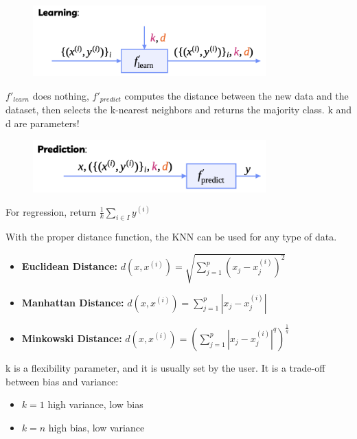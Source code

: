 \begin{figure}[H]
    \centering
    \includegraphics[width=0.8\textwidth]{assets/fig33.png}
\end{figure}

$f'_{learn}$ does nothing, $f'_{predict}$ computes the distance between the new data and the dataset, then selects the k-nearest neighbors and returns the majority class. k and d are parameters!

\begin{figure}[H]
    \centering
    \includegraphics[width=0.8\textwidth]{assets/fig34.png}
\end{figure}

For regression, return $\frac{1}{k}\sum_{i \in I}y^{(i)}$

With the proper distance function, the KNN can be used for any type of data.

\begin{exampleblock}
    \begin{itemize}
        \item \textbf{Euclidean Distance:} $d(x, x^{(i)}) = \sqrt{\sum_{j=1}^{p}(x_j - x^{(i)}_j)^2}$
        \item \textbf{Manhattan Distance:} $d(x, x^{(i)}) = \sum_{j=1}^{p}|x_j - x^{(i)}_j|$
        \item \textbf{Minkowski Distance:} $d(x, x^{(i)}) = (\sum_{j=1}^{p}|x_j - x^{(i)}_j|^q)^{\frac{1}{q}}$
    \end{itemize}
\end{exampleblock}

k is a flexibility parameter, and it is usually set by the user. It is a trade-off between bias and variance:   
\begin{itemize}
    \item $k = 1$ \to high variance, low bias
    \item $k = n$ \to high bias, low variance
\end{itemize}



